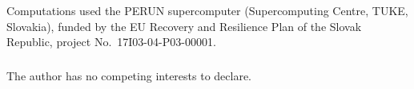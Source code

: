 \documentclass[runningheads]{llncs}
\begin{document}
\begin{credits}
\subsubsection{\ackname} Computations used the PERUN supercomputer
(Supercomputing Centre, TUKE, Slovakia), funded by the EU Recovery and
Resilience Plan of the Slovak Republic, project No.~17I03-04-P03-00001.

\subsubsection{\discintname} The author has no competing interests to declare.
\end{credits}



\end{document}
